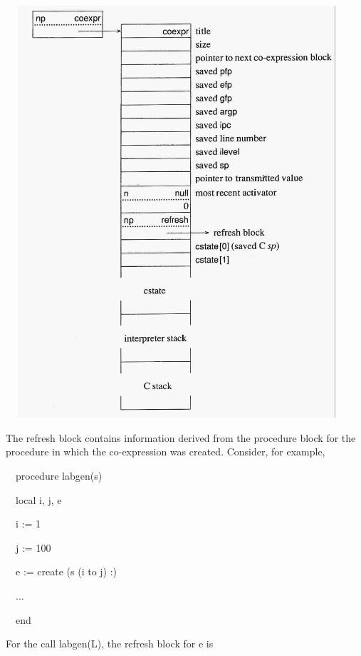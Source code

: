 \ \  \includegraphics[width=4.702in,height=6.0126in]{ib-img/ib-img130.jpg} 


The refresh block contains information derived from the procedure
block for the procedure in which the co-expression was
created. Consider, for example,

{\ttfamily\mdseries
\ \ procedure labgen(s)}

{\ttfamily\mdseries
\ \ local i, j, e}

{\ttfamily\mdseries
\ \ i := 1}

{\ttfamily\mdseries
\ \ j := 100}

{\ttfamily\mdseries
\ \ e := create (s {\textbar}{\textbar} (i to j) {\textbar}{\textbar} {\textquotedbl}:{\textquotedbl})}

{\ttfamily\mdseries
\ \ ...}

{\ttfamily\mdseries
\ \ end}


For the call labgen({\textquotedbl}L{\textquotedbl}), the refresh block for e is


\bigskip


\bigskip


\bigskip


\bigskip


